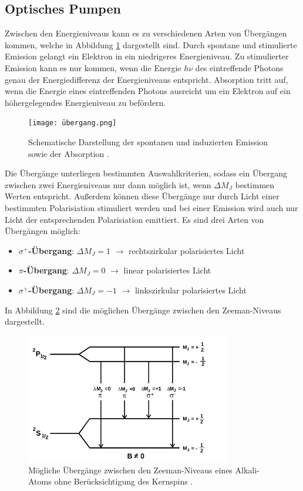 \subsection{Optisches Pumpen}
Zwischen den Energieniveaus kann es zu verschiedenen Arten von Übergängen kommen, welche in Abbildung \ref{fig:tfig2} dargestellt sind.
Durch spontane und stimulierte Emission gelangt ein Elektron in ein niedrigeres Energieniveau.
Zu stimulierter Emission kann es nur kommen, wenn die Energie $h \nu$ des eintreffende Photons genau der Energiedifferenz der Energieniveaus entspricht.
Absorption tritt auf, wenn die Energie eines eintreffenden Photons ausreicht um ein Elektron auf ein höhergelegendes Energieniveau zu befördern.
\FloatBarrier
\begin{figure}[h]
    \centering
    \texttt{[image: übergang.png]}
    \caption{Schematische Darstellung der spontanen und induzierten Emission sowie der Absorption \cite{quelle02}.}
    \label{fig:tfig2}
\end{figure}
\FloatBarrier
\noindent

Die Übergänge unterliegen bestimmten Auswahlkriterien, sodass ein Übergang zwischen zwei Energieniveaus nur dann möglich ist, wenn $\Delta M_J$ bestimmen Werten entspricht.
Außerdem können diese Übergänge nur durch Licht einer bestimmten Polarisiation stimuliert werden und bei einer Emission wird auch nur Licht der entsprechenden Polarisiation emittiert.
Es sind drei Arten von Übergängen möglich:
\begin{itemize}
\item \textbf{$\sigma^+$-Übergang}: $\Delta M_J=1$ $\rightarrow$ rechtszirkular polarisiertes Licht
\item \textbf{$\pi$-Übergang}: $\Delta M_J=0$ $\rightarrow$ linear polarisiertes Licht
\item \textbf{$\sigma^+$-Übergang}: $\Delta M_J=-1$ $\rightarrow$ linkszirkular polarisiertes Licht
\end{itemize}
In Abbildung \ref{fig:tfig3} sind die möglichen Übergänge zwischen den Zeeman-Niveaus dargestellt.
\FloatBarrier
\begin{figure}[h]
    \centering
    \includegraphics[width=0.8\textwidth]{pumpenschema.png}
    \caption{Mögliche Übergänge zwischen den Zeeman-Niveaus eines Alkali-Atoms ohne Berücksichtigung des Kernspins \cite{quelle01}.}
    \label{fig:tfig3}
\end{figure}
\FloatBarrier
\noindent

